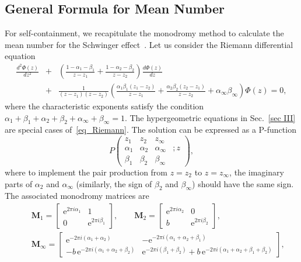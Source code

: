 \documentclass[aps,nofootinbib,superscriptaddress
]{revtex4}
\begin{document}
\begin{appendix}
\section{General Formula for Mean Number} \label{app_B}
For self-containment, we recapitulate the monodromy method to calculate the mean number for the Schwinger effect~\cite{Chen:2022hpe}. Let us consider the Riemann differential equation
\begin{eqnarray} \label{eq_Riemann}
\frac{d^2 \Phi(z)}{dz^2} &+& \left( \frac{1 - \alpha_1 - \beta_1}{z - z_1} + \frac{1 - \alpha_2 - \beta_2}{z - z_2} \right) \frac{d \Phi(z)}{dz}
\nonumber\\
&+& \frac{1}{(z - z_1)(z - z_2)} \left( \frac{\alpha_1 \beta_1 (z_1 - z_2)}{z - z_1} + \frac{\alpha_2 \beta_2 (z_2 - z_1)}{z - z_2} + \alpha_\infty \beta_\infty \right) \Phi(z) = 0,
\end{eqnarray}
where the characteristic exponents satisfy the condition $\alpha_1 + \beta_1 + \alpha_2 + \beta_2 + \alpha_\infty + \beta_\infty = 1$. The hypergeometric equations in Sec.~\ref{sec III} are special cases of~\eqref{eq_Riemann}. The solution can be expressed as a P-function
\begin{equation} \label{eq_Pfun}
P \begin{pmatrix} z_1 & z_2 & z_\infty & \\ \alpha_1 & \alpha_2 & \alpha_\infty & ; z \\ \beta_1 & \beta_2 & \beta_\infty & \end{pmatrix},
\end{equation}
where to implement the pair production from $z = z_2$ to $z = z_\infty$, the imaginary parts of $\alpha_2$ and $\alpha_\infty$ (similarly, the sign of $\beta_2$ and $\beta_\infty$) should have the same sign. The associated monodromy matrices are
\begin{eqnarray}
&& \mathbf{M}_1 = \begin{bmatrix} \mathrm{e}^{2 \pi i \alpha_1} & 1 \\ 0 & \mathrm{e}^{2 \pi i \beta_1} \end{bmatrix}, \qquad \mathbf{M}_2 = \begin{bmatrix} \mathrm{e}^{2 \pi i \alpha_2} & 0 \\ b & \mathrm{e}^{2 \pi i \beta_2} \end{bmatrix},
\nonumber\\
&& \mathbf{M}_\infty = \begin{bmatrix} \mathrm{e}^{- 2 \pi i (\alpha_1 + \alpha_2)} & - \mathrm{e}^{- 2 \pi i (\alpha_1 + \alpha_2 + \beta_1)} \\ - b \, \mathrm{e}^{- 2 \pi i (\alpha_1 + \alpha_2 + \beta_2)} & \mathrm{e}^{- 2 \pi i (\beta_1 + \beta_2)} + b \, \mathrm{e}^{- 2 \pi i (\alpha_1 + \alpha_2 + \beta_1 + \beta_2)} \end{bmatrix},

\end{eqnarray}
\end{appendix}
\end{document}
